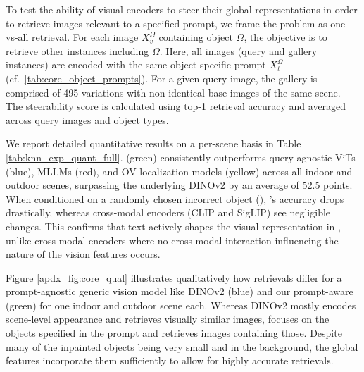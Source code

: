 To test the ability of visual encoders to steer their global representations in order to retrieve images relevant to a specified prompt, we frame the problem as one-vs-all retrieval. 
For each image $X_v^\Omega$ containing object $\Omega$, the objective is to retrieve other instances including $\Omega$. Here, all images (query and gallery instances) are encoded with the same object-specific prompt $X_t^\Omega$ (cf.~\cref{tab:core_object_prompts}). For a given query image, the gallery is comprised of 495 variations with non-identical base images of the same scene. The steerability score is calculated using top-1 retrieval accuracy and averaged across query images and object types.


We report detailed quantitative results on a per-scene basis in Table \ref{tab:knn_exp_quant_full}. 
\model{} (green) consistently outperforms query-agnostic ViTs (blue), MLLMs (red), and OV localization models (yellow) across all indoor and outdoor scenes, surpassing the underlying DINOv2 by an average of 52.5 points.
When conditioned on a randomly chosen incorrect object (\xmark), \model{}'s accuracy drops drastically, whereas cross-modal encoders (CLIP and SigLIP) see negligible changes.
This confirms that text actively shapes the visual representation in \model{}, unlike cross-modal encoders where no cross-modal interaction influencing the nature of the vision features occurs.


Figure \ref{apdx_fig:core_qual} illustrates qualitatively how retrievals differ for a prompt-agnostic generic vision model like DINOv2 (blue) and our prompt-aware \model{} (green) for one indoor and outdoor scene each. 
Whereas DINOv2 mostly encodes scene-level appearance and retrieves visually similar images, \model{} focuses on the objects specified in the prompt and retrieves images containing those.
Despite many of the inpainted objects being very small and in the background, the global features incorporate them sufficiently to allow for highly accurate retrievals. 


